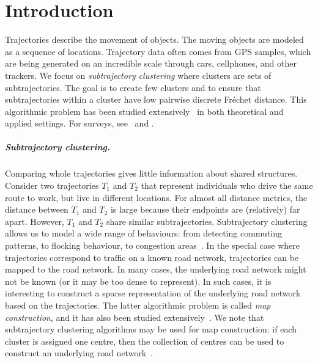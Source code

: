 \documentclass[11pt]{article}
\newcommand{\frechet}{Fr\'{e}chet\xspace}
\begin{document}
\section{Introduction}
%
Trajectories describe the movement of objects.
The moving objects are modeled as a sequence of locations.
Trajectory data often comes from GPS samples, which are being generated on an incredible scale through cars, cellphones, and other trackers.  
We focus on \emph{subtrajectory clustering} where clusters are sets of subtrajectories. The goal is to create few clusters and to ensure that subtrajectories within a cluster have low pairwise discrete \frechet distance. This algorithmic problem has been studied extensively~\cite{agarwal2018subtrajectory, bruning2022faster, buchin2020improved, buchin2011detecting,  buchin2013median, chen2013pathlet, conradi2023finding, gaffney1999trajectory, gudmundsson2012gpu, gudmundsson2022cubic, gudmundsson2012motifs, hung2015clustering, lee2007trajectory, sung2012trajectory} in both theoretical and applied settings. 
For surveys, see~\cite{bian2018survey} and \cite{machado2024survey}.
%
\subparagraph{Subtrajectory clustering. } 
Comparing whole trajectories gives little information about shared structures. Consider two trajectories $T_1$ and $T_2$ that represent individuals who drive the same route to work, but live in different locations. 
For almost all distance metrics, the distance between $T_1$ and $T_2$ is large because their endpoints are (relatively) far apart. However, $T_1$ and $T_2$ share similar subtrajectories. 
Subtrajectory clustering allows us to model a wide range of behaviours: from detecting commuting patterns, to flocking behaviour, to congestion areas~\cite{buchin2011detecting}. 
In the special case where trajectories correspond to traffic on a known road network,
trajectories can be mapped to the road network. In many cases, the underlying road network might not be known (or it may be too dense to represent).
In such cases, it is interesting to construct a sparse representation of the underlying road network based on the trajectories.
The latter algorithmic problem is called \emph{map construction}, and it has also been studied extensively~\cite{
ahmed2015comparison, biagioni2012map, ahmed2012constructing,cao2009gps, davies2006scalable,karagiorgou2012vehicle, karagiorgou2013segmentation}.
We note that subtrajectory clustering algorithms may be used for map construction: if each cluster is assigned one centre, then the collection of centres can be used to construct an underlying road network~\cite{buchin2017clustering, buchin2020improved}.
\end{document}
